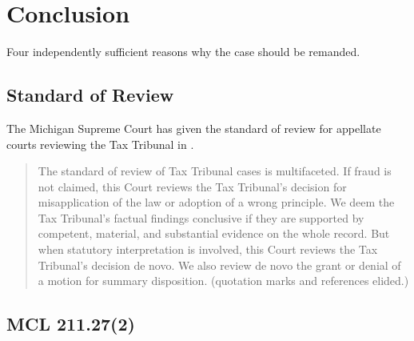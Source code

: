\section{Conclusion}

Four independently sufficient reasons why the case should be remanded.


\subsection{Standard of Review}
 
The Michigan Supreme Court has given the standard of review for appellate courts reviewing the Tax Tribunal in .

\begin{quote}
  The standard of review of Tax Tribunal cases is multifaceted. If fraud is not claimed, this Court reviews the Tax Tribunal's decision for misapplication of the law or adoption of a wrong principle. We deem the Tax Tribunal's factual findings conclusive if they are supported by competent, material, and substantial evidence on the whole record. But when statutory interpretation is involved, this Court reviews the Tax Tribunal's decision de novo. We also review de novo the grant or denial of a motion for summary disposition. (quotation marks and references elided.)
\end{quote}

\subsection{MCL 211.27(2)}
 
